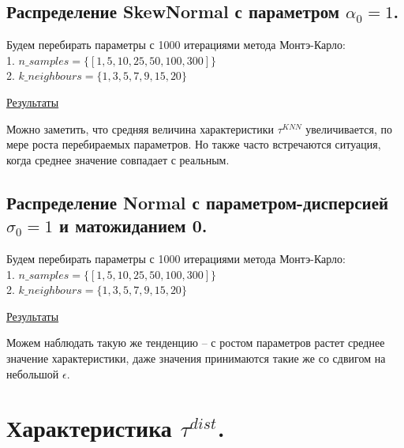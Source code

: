 \documentclass{report}
\begin{document}
\subsection{Распределение SkewNormal с параметром $\alpha_0=1$.}
Будем перебирать параметры с 1000 итерациями метода Монтэ-Карло:\\
1. $n\_samples = \{[1, 5, 10, 25, 50, 100, 300]\}$\\
2. $k\_neighbours = \{1, 3, 5, 7, 9, 15, 20\}$

\href{https://github.com/misshimichka/dm-random-graphs/blob/dmitrii/report/report/fix_alpha_skewnorm_max_deg_knn.png}{Результаты}

Можно заметить, что средняя величина характеристики $\tau^{KNN}$ увеличивается, по мере роста перебираемых параметров. Но также часто встречаются ситуация, когда среднее значение совпадает с реальным.

\subsection{Распределение Normal с параметром-дисперсией $\sigma_0=1$ и матожиданием 0.}
Будем перебирать параметры с 1000 итерациями метода Монтэ-Карло:\\
1. $n\_samples = \{[1, 5, 10, 25, 50, 100, 300]\}$\\
2. $k\_neighbours = \{1, 3, 5, 7, 9, 15, 20\}$

\href{https://github.com/misshimichka/dm-random-graphs/blob/dmitrii/report/report/fix_sigma_norm_max_deg_knn.png}{Результаты}

Можем наблюдать такую же тенденцию -- с ростом параметров растет среднее значение характеристики, даже значения принимаются такие же со сдвигом на небольшой $\epsilon$.

\section{Характеристика $\tau^{dist}$.}
\end{document}
